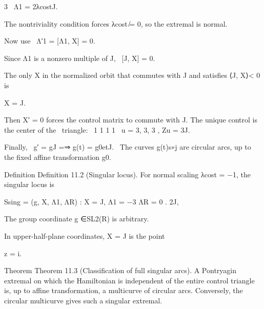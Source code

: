 \begin{displaytext}
3 \
Λ1 = 2λcostJ.
\end{displaytext}

\begin{displaytext}
The nontriviality condition forces λcost ̸= 0, so the extremal is normal.
\end{displaytext}

\begin{displaytext}
Now use \
Λ′1 = [Λ1, X] = 0.
\end{displaytext}

\begin{displaytext}
Since Λ1 is a nonzero multiple of J, \
[J, X] = 0.
\end{displaytext}

The only X in the normalized orbit that commutes with J and satisfies ⟨J, X⟩< 0 is


X = J.


\begin{displaytext}
Then X′ = 0 forces the control matrix to commute with J. The unique control is the center of the \
triangle: \
1 1 1 1 \
u = 3, 3, 3 , Zu = 3J.
\end{displaytext}

\begin{displaytext}
Finally, \
g′ = gJ =⇒ g(t) = g0etJ. \
The curves g(t)s∗j are circular arcs, up to the fixed affine transformation g0.
\end{displaytext}

\begin{statementbox}{Definition}
Definition 11.2 (Singular locus). For normal scaling λcost = −1, the singular locus is
\end{statementbox}

\begin{displaytext}
Ssing = (g, X, Λ1, ΛR) : X = J, Λ1 = −3 ΛR = 0 . 2J,
\end{displaytext}

The group coordinate g ∈SL2(R) is arbitrary.


In upper-half-plane coordinates, X = J is the point


z = i.


\begin{statementbox}{Theorem}
Theorem 11.3 (Classification of full singular arcs). A Pontryagin extremal on which the Hamiltonian is independent of the entire control triangle is, up to affine transformation, a multicurve of circular arcs. Conversely, the circular multicurve gives such a singular extremal.
\end{statementbox}

